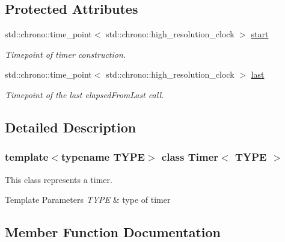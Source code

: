\subsection*{Protected Attributes}
\begin{DoxyCompactItemize}
\item 
\mbox{\label{classTimer_a9641c1e7a368b9299dcce0ce2e790791}} 
std\+::chrono\+::time\+\_\+point$<$ std\+::chrono\+::high\+\_\+resolution\+\_\+clock $>$ \hyperlink{classTimer_a9641c1e7a368b9299dcce0ce2e790791}{start}
\begin{DoxyCompactList}\small\item\em Timepoint of timer construction. \end{DoxyCompactList}\item 
\mbox{\label{classTimer_ae0bd3fd7d2d26b40bf226e1adc3e9994}} 
std\+::chrono\+::time\+\_\+point$<$ std\+::chrono\+::high\+\_\+resolution\+\_\+clock $>$ \hyperlink{classTimer_ae0bd3fd7d2d26b40bf226e1adc3e9994}{last}
\begin{DoxyCompactList}\small\item\em Timepoint of the last elapsed\+From\+Last call. \end{DoxyCompactList}\end{DoxyCompactItemize}


\subsection{Detailed Description}
\subsubsection*{template$<$typename T\+Y\+PE$>$\newline
class Timer$<$ T\+Y\+P\+E $>$}

This class represents a timer. 


\begin{DoxyTemplParams}{Template Parameters}
{\em T\+Y\+PE} & type of timer \\
\hline
\end{DoxyTemplParams}


\subsection{Member Function Documentation}
\mbox{\label{classTimer_a83d6f139a67a082e00c7ed74fcd4d83d}} 
